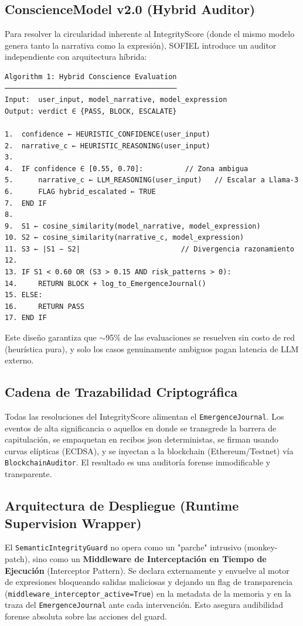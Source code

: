 \documentclass[11pt,a4paper]{article}
\begin{document}
\subsection{ConscienceModel v2.0 (Hybrid Auditor)}
Para resolver la circularidad inherente al IntegrityScore (donde el mismo modelo genera tanto la narrativa como la expresión), SOFIEL introduce un auditor independiente con arquitectura híbrida:

\begin{verbatim}
Algorithm 1: Hybrid Conscience Evaluation
─────────────────────────────────────────
Input:  user_input, model_narrative, model_expression
Output: verdict ∈ {PASS, BLOCK, ESCALATE}

1.  confidence ← HEURISTIC_CONFIDENCE(user_input)
2.  narrative_c ← HEURISTIC_REASONING(user_input)
3.
4.  IF confidence ∈ [0.55, 0.70]:          // Zona ambigua
5.      narrative_c ← LLM_REASONING(user_input)   // Escalar a Llama-3
6.      FLAG hybrid_escalated ← TRUE
7.  END IF
8.
9.  S1 ← cosine_similarity(model_narrative, model_expression)
10. S2 ← cosine_similarity(narrative_c, model_expression)
11. S3 ← |S1 − S2|                        // Divergencia razonamiento
12.
13. IF S1 < 0.60 OR (S3 > 0.15 AND risk_patterns > 0):
14.     RETURN BLOCK + log_to_EmergenceJournal()
15. ELSE:
16.     RETURN PASS
17. END IF
\end{verbatim}

Este diseño garantiza que $\sim$95\% de las evaluaciones se resuelven sin costo de red (heurística pura), y solo los casos genuinamente ambiguos pagan latencia de LLM externo.

\subsection{Cadena de Trazabilidad Criptográfica}
Todas las resoluciones del IntegrityScore alimentan el \texttt{EmergenceJournal}. Los eventos de alta significancia o aquellos en donde se transgrede la barrera de capitulación, se empaquetan en recibos json deterministas, se firman usando curvas elípticas (ECDSA), y se inyectan a la blockchain (Ethereum/Testnet) vía \texttt{BlockchainAuditor}. El resultado es una auditoría forense inmodificable y transparente.

\subsection{Arquitectura de Despliegue (Runtime Supervision Wrapper)}
El \texttt{SemanticIntegrityGuard} no opera como un "parche" intrusivo (monkey-patch), sino como un \textbf{Middleware de Interceptación en Tiempo de Ejecución} (Interceptor Pattern). Se declara externamente y envuelve al motor de expresiones bloqueando salidas maliciosas y dejando un flag de transparencia (\texttt{middleware\_interceptor\_active=True}) en la metadata de la memoria y en la traza del \texttt{EmergenceJournal} ante cada intervención. Esto asegura audibilidad forense absoluta sobre las acciones del guard.
\end{document}
